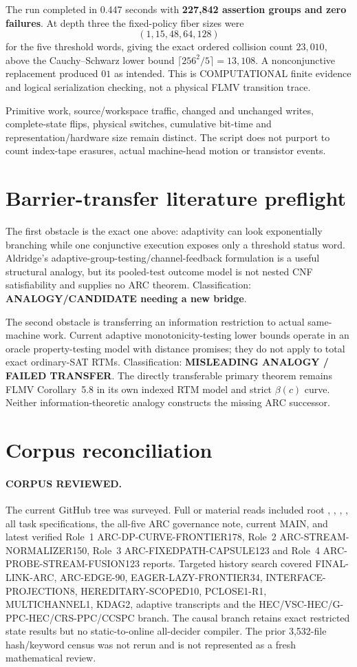 \documentclass[11pt]{article}
\begin{document}
The run completed in 0.447 seconds with
\textbf{227,842 assertion groups and zero failures}.  At depth three the
fixed-policy fiber sizes were
\[
 (1,15,48,64,128)
\]
for the five threshold words, giving the exact ordered collision count
$23,010$, above the Cauchy--Schwarz lower bound
$\lceil256^2/5\rceil=13,108$.  A nonconjunctive replacement produced
$01$ as intended.  This is COMPUTATIONAL finite evidence and logical
serialization checking, not a physical FLMV transition trace.

Primitive work, source/workspace traffic, changed and unchanged writes,
complete-state flips, physical switches, cumulative bit-time and
representation/hardware size remain distinct.  The script does not purport to
count index-tape erasures, actual machine-head motion or transistor events.

\section{Barrier-transfer literature preflight}
The first obstacle is the exact one above: adaptivity can look exponentially
branching while one conjunctive execution exposes only a threshold status
word.  Aldridge's adaptive-group-testing/channel-feedback formulation is a
useful structural analogy, but its pooled-test outcome model is not nested CNF
satisfiability and supplies no ARC theorem.  Classification:
\textbf{ANALOGY/CANDIDATE needing a new bridge}.

The second obstacle is transferring an information restriction to actual
same-machine work.  Current adaptive monotonicity-testing lower bounds operate
in an oracle property-testing model with distance promises; they do not apply
to total exact ordinary-SAT RTMs.  Classification:
\textbf{MISLEADING ANALOGY / FAILED TRANSFER}.  The directly transferable
primary theorem remains FLMV Corollary~5.8 in its own indexed RTM model and
strict $\beta(c)$ curve.  Neither information-theoretic analogy constructs the
missing ARC successor.

\section{Corpus reconciliation}
\paragraph{CORPUS REVIEWED.}
The current GitHub tree was surveyed.  Full or material reads included root
, , ,
, all task specifications, the
all-five ARC governance note, current MAIN, and latest verified Role~1
ARC-DP-CURVE-FRONTIER178, Role~2 ARC-STREAM-NORMALIZER150, Role~3
ARC-FIXEDPATH-CAPSULE123 and Role~4 ARC-PROBE-STREAM-FUSION123 reports.
Targeted history search covered FINAL-LINK-ARC, ARC-EDGE-90,
EAGER-LAZY-FRONTIER34, INTERFACE-PROJECTION8, HEREDITARY-SCOPED10,
PCLOSE1-R1, MULTICHANNEL1, KDAG2, adaptive transcripts and the
HEC/VSC-HEC/G-PPC-HEC/CRS-PPC/CCSPC branch.  The causal branch retains exact
restricted state results but no static-to-online all-decider compiler.  The
prior 3,532-file hash/keyword census was not rerun and is not represented as a
fresh mathematical review.
\end{document}
